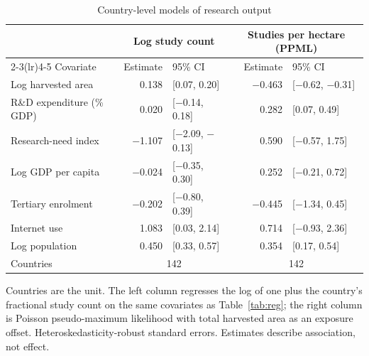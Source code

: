 \documentclass[ASNA,twocolumn]{USG}
\begin{document}
\begin{table}[!t]
\centering
\footnotesize
\caption{Country-level models of research output}
\label{tab:countrylevel}
\begin{tabular*}{\textwidth}{@{\extracolsep\fill}l r@{\hspace{6pt}}l r@{\hspace{6pt}}l@{}}
\toprule
& \multicolumn{2}{c}{Log study count} & \multicolumn{2}{c}{Studies per hectare (PPML)} \\
\cmidrule(lr){2-3}\cmidrule(lr){4-5}
Covariate & Estimate & 95\% CI & Estimate & 95\% CI \\
\midrule
Log harvested area & 0.138 & [0.07, 0.20] & $-$0.463 & [$-$0.62, $-$0.31] \\
R\&D expenditure (\% GDP) & 0.020 & [$-$0.14, 0.18] & 0.282 & [0.07, 0.49] \\
Research-need index & $-$1.107 & [$-$2.09, $-$0.13] & 0.590 & [$-$0.57, 1.75] \\
Log GDP per capita & $-$0.024 & [$-$0.35, 0.30] & 0.252 & [$-$0.21, 0.72] \\
Tertiary enrolment & $-$0.202 & [$-$0.80, 0.39] & $-$0.445 & [$-$1.34, 0.45] \\
Internet use & 1.083 & [0.03, 2.14] & 0.714 & [$-$0.93, 2.36] \\
Log population & 0.450 & [0.33, 0.57] & 0.354 & [0.17, 0.54] \\
\midrule
Countries & \multicolumn{2}{c}{142} & \multicolumn{2}{c}{142} \\
\bottomrule
\end{tabular*}
\begin{tablenotes}
\item[] Countries are the unit. The left column regresses the log of one plus the country's fractional study count on the same covariates as Table~\ref{tab:reg}; the right column is Poisson pseudo-maximum likelihood with total harvested area as an exposure offset. Heteroskedasticity-robust standard errors. Estimates describe association, not effect.
\end{tablenotes}
\end{table}
\end{document}
